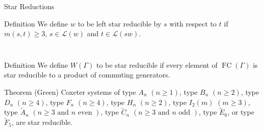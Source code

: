 \documentclass[9pt,handout]{beamer}
\DeclareMathOperator{\FC}{FC}
\newcommand{\LD}{\mathcal{L}}
\newcommand\heapblock[4]{\fill[fill=#4, fill opacity=0.35, draw=#4, line width=1.1pt, rounded corners,shift={(\xxaxis:#1)},shift={(\yyaxis:#2)}] (-1,-1) rectangle (1,1);\node at (#1,#2) {\footnotesize $#3$};}
\newcommand\dheapblock[4]{\draw[dotted, draw=#4, line width=1.1pt, rounded corners,shift={(\xxaxis:#1)},shift={(\yyaxis:#2)}] (-1,-1) rectangle (1,1);\node at (#1,#2) {\footnotesize $#3$};}
\newcommand\xxaxis{0}
\newcommand\yyaxis{90}
\begin{document}
\begin{frame}{Star Reductions}
\begin{block}{Definition}
	We define $w$ to be \alert{left star reducible by $s$ with respect to $t$} if $m(s,t) \geq 3$, $s \in \LD(w)$ and $ t \in \LD(sw)$.
\end{block}

\pause

\begin{columns}
\begin{column}{0.4\textwidth}
\begin{figure} \centering
{}
\end{figure}	
\end{column}
	
\begin{column}{0.4\textwidth}	
\begin{figure}
\end{figure}
\end{column}
\end{columns}

\pause

\begin{block}{Definition}
	We define $W(\Gamma)$ to be \alert{star reducible} if every element of $\FC(\Gamma)$ is star reducible to a product of commuting generators.
\end{block}

\pause

\begin{block}{Theorem (Green)}
	Coxeter systems of type $A_n$ $(n \geq 1)$, type $B_n$ $(n \geq 2)$, type $D_n$ $(n \geq 4)$, type $F_n$ $(n \geq 4)$, type $H_n$ $(n \geq 2)$, type $I_2(m)$ $(m \geq 3)$, type $\widetilde{A}_{n}$ $(n \geq 3 \text{ and } n \text{ even })$, type $\widetilde{C}_{n}$ $(n\geq 3 \text{ and } n \text{ odd })$, type $\widetilde{E}_6$, or type $\widetilde{F}_5$, are star reducible.
\end{block}
	
\end{frame}


\end{document}
